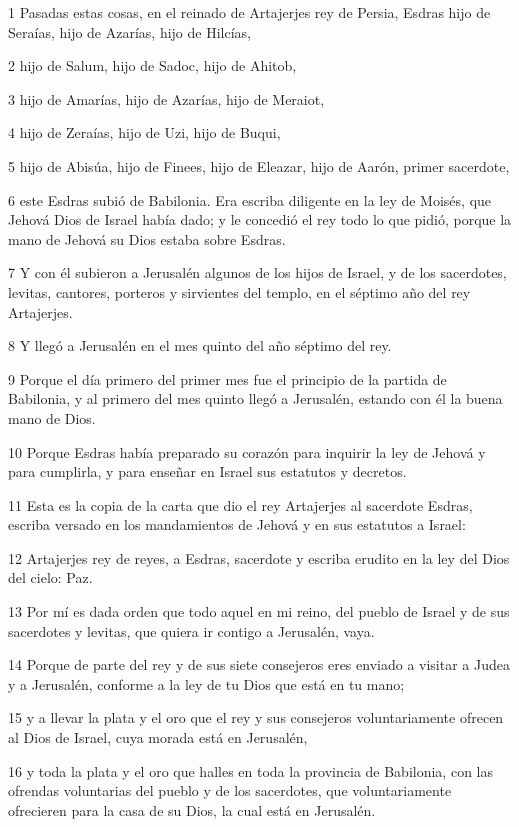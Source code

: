 \par 1 Pasadas estas cosas, en el reinado de Artajerjes rey de Persia, Esdras hijo de Seraías, hijo de Azarías, hijo de Hilcías,
\par 2 hijo de Salum, hijo de Sadoc, hijo de Ahitob,
\par 3 hijo de Amarías, hijo de Azarías, hijo de Meraiot,
\par 4 hijo de Zeraías, hijo de Uzi, hijo de Buqui,
\par 5 hijo de Abisúa, hijo de Finees, hijo de Eleazar, hijo de Aarón, primer sacerdote,
\par 6 este Esdras subió de Babilonia. Era escriba diligente en la ley de Moisés, que Jehová Dios de Israel había dado; y le concedió el rey todo lo que pidió, porque la mano de Jehová su Dios estaba sobre Esdras.
\par 7 Y con él subieron a Jerusalén algunos de los hijos de Israel, y de los sacerdotes, levitas, cantores, porteros y sirvientes del templo, en el séptimo año del rey Artajerjes.
\par 8 Y llegó a Jerusalén en el mes quinto del año séptimo del rey.
\par 9 Porque el día primero del primer mes fue el principio de la partida de Babilonia, y al primero del mes quinto llegó a Jerusalén, estando con él la buena mano de Dios.
\par 10 Porque Esdras había preparado su corazón para inquirir la ley de Jehová y para cumplirla, y para enseñar en Israel sus estatutos y decretos.
\par 11 Esta es la copia de la carta que dio el rey Artajerjes al sacerdote Esdras, escriba versado en los mandamientos de Jehová y en sus estatutos a Israel:
\par 12 Artajerjes rey de reyes, a Esdras, sacerdote y escriba erudito en la ley del Dios del cielo: Paz.
\par 13 Por mí es dada orden que todo aquel en mi reino, del pueblo de Israel y de sus sacerdotes y levitas, que quiera ir contigo a Jerusalén, vaya.
\par 14 Porque de parte del rey y de sus siete consejeros eres enviado a visitar a Judea y a Jerusalén, conforme a la ley de tu Dios que está en tu mano;
\par 15 y a llevar la plata y el oro que el rey y sus consejeros voluntariamente ofrecen al Dios de Israel, cuya morada está en Jerusalén,
\par 16 y toda la plata y el oro que halles en toda la provincia de Babilonia, con las ofrendas voluntarias del pueblo y de los sacerdotes, que voluntariamente ofrecieren para la casa de su Dios, la cual está en Jerusalén.
